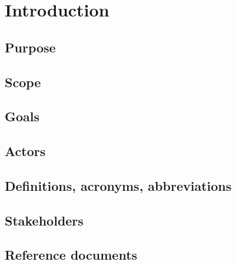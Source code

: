 \documentclass[12pt, a4paper]{article}
\title{
	\Huge{\textbf{\centerline{myTaxiService}}}
	\newline
	\huge{\textbf{R}equirement \textbf{A}nalysis and \textbf{S}pecification \textbf{D}ocument}
}
\author{
	Monica Magoni 854091
	\\
	Alberto Cibari 852689
}
\date{\today}
\begin{document}
	\maketitle
	\newpage
	\renewcommand*\contentsname{\Huge{Contents}}
	\tableofcontents
	
	\newpage
	
    \section{Introduction}
    	
    	\subsection{Purpose}
    	
    	
    	\subsection{Scope}
    	
    	
    	\subsection{Goals}
    	
    	
    	\subsection{Actors}
    	
    	
    	\subsection{Definitions, acronyms, abbreviations}
    	
    	
    	\subsection{Stakeholders}
    	
    	
    	\subsection{Reference documents}
    	
    
\end{document}
